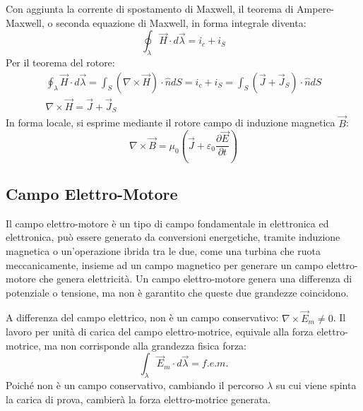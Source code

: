\documentclass{article}
\numberwithin{equation}{subsection}
\begin{document}
\begin{center}
\end{center}

Con aggiunta la corrente di spostamento di Maxwell, il teorema di Ampere-Maxwell, o seconda equazione di Maxwell, in forma integrale diventa:
\begin{equation*}
    \oint_{\lambda}\vec{H}\cdot d\vec{\lambda}=i_c+i_S
\end{equation*}
Per il teorema del rotore:
\begin{gather*}
    \displaystyle\oint_{\lambda}\vec{H}\cdot d\vec{\lambda}=\int_S(\nabla\times\vec{H})\cdot\hat{n}dS=i_c+i_S=\int_S(\vec{J}+\vec{J}_S)\cdot\hat{n}dS\\
    \nabla\times\vec{H}=\vec{J}+\vec{J}_S
\end{gather*}
In forma locale, si esprime mediante il rotore campo di induzione magnetica $\vec{B}$:
\begin{equation}
    \nabla\times\vec{B}=\mu_0\left(\vec{J}+\varepsilon_0\displaystyle\frac{\partial \vec{E}}{\partial t}\right)
\end{equation}

\subsection{Campo Elettro-Motore}

Il campo elettro-motore è un tipo di campo fondamentale in elettronica ed elettronica, può essere generato da conversioni energetiche, tramite induzione magnetica o un'operazione 
ibrida tra le due, come una turbina che ruota meccanicamente, insieme ad un campo magnetico per generare un campo elettro-motore che genera elettricità. Un campo elettro-motore 
genera una differenza di potenziale o tensione, ma non è garantito che queste due grandezze coincidono. 

A differenza del campo elettrico, non è un campo conservativo: $\nabla\times\vec{E}_m\neq0$. Il lavoro per unità di carica del campo elettro-motrice, equivale alla 
forza elettro-motrice, ma non corrisponde alla grandezza fisica forza:
\begin{equation*}
    \displaystyle\int_{\lambda}\vec{E}_m\cdot d\vec{\lambda}=f.e.m.
\end{equation*}
Poiché non è un campo conservativo, cambiando il percorso $\lambda$ su cui viene spinta la carica di prova, cambierà la forza elettro-motrice generata. 
\end{document}
